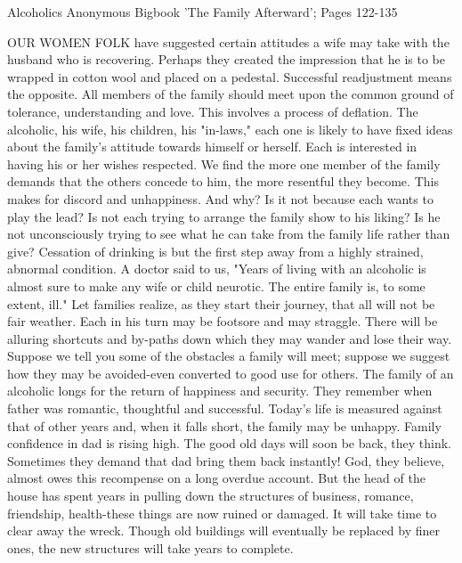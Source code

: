 
Alcoholics Anonymous Bigbook 'The Family Afterward'; Pages 122-135

\begin{biblechapter}
OUR WOMEN FOLK have suggested certain attitudes a wife may take with the husband who is recovering.  Perhaps they created the impression that he is to be wrapped in cotton wool and placed on a pedestal.  Successful readjustment means the opposite.  All members of the family should meet upon the common ground of tolerance, understanding and love.  This involves a process of deflation.  The alcoholic, his wife, his children, his "in-laws," each one is likely to have fixed ideas about the family's attitude towards himself or herself.  Each is interested in having his or her wishes respected.  We find the more one member of the family demands that the others concede to him, the more resentful they become.  This makes for discord and unhappiness.
And why?  Is it not because each wants to play the lead?  Is not each trying to arrange the family show to his liking?  Is he not unconsciously trying to see what he can take from the family life rather than give?
Cessation of drinking is but the first step away from a highly strained, abnormal condition.  A doctor said to us, "Years of living with an alcoholic is almost sure to make any wife or child neurotic.  The entire family is, to some extent, ill."  Let families realize, as they start their journey, that all will not be fair weather.  Each in his turn may be footsore and may straggle.  There will be alluring shortcuts and by-paths down which they may wander and lose their way.
Suppose we tell you some of the obstacles a family will meet; suppose we suggest how they may be avoided-even converted to good use for others.  The family of an alcoholic longs for the return of happiness and security.  They remember when father was romantic, thoughtful and successful.  Today's life is measured against that of other years and, when it falls short, the family may be unhappy.
Family confidence in dad is rising high.  The good old days will soon be back, they think.  Sometimes they demand that dad bring them back instantly!  God, they believe, almost owes this recompense on a long overdue account.  But the head of the house has spent years in pulling down the structures of business, romance, friendship, health-these things are now ruined or damaged.  It will take time to clear away the wreck.  Though old buildings will eventually be replaced by finer ones, the new structures will take years to complete.

\end{biblechapter}

